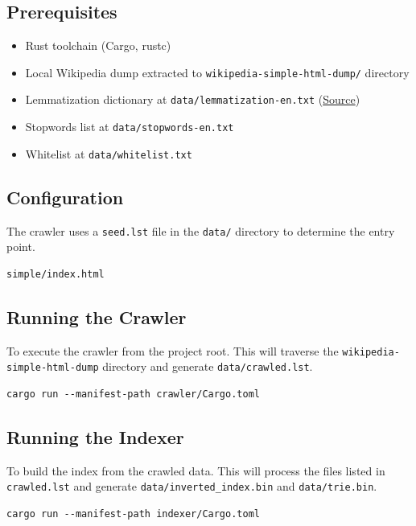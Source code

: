 \documentclass[11pt, a4paper]{article}
\begin{document}
\subsection{Prerequisites}
\begin{itemize}
    \item Rust toolchain (Cargo, rustc)
    \item Local Wikipedia dump extracted to \texttt{wikipedia-simple-html-dump/} directory
    \item Lemmatization dictionary at \texttt{data/lemmatization-en.txt} (\href{https://github.com/michmech/lemmatization-lists}{Source})
    \item Stopwords list at \texttt{data/stopwords-en.txt}
    \item Whitelist at \texttt{data/whitelist.txt}
\end{itemize}

\subsection{Configuration}
The crawler uses a \texttt{seed.lst} file in the \texttt{data/} directory to determine the entry point.

\begin{verbatim}
simple/index.html
\end{verbatim}

\subsection{Running the Crawler}
To execute the crawler from the project root. This will traverse the \texttt{wikipedia-simple-html-dump} directory and generate \texttt{data/crawled.lst}.

\begin{verbatim}
cargo run --manifest-path crawler/Cargo.toml
\end{verbatim}

\subsection{Running the Indexer}
To build the index from the crawled data. This will process the files listed in \texttt{crawled.lst} and generate \texttt{data/inverted\_index.bin} and \texttt{data/trie.bin}.

\begin{verbatim}
cargo run --manifest-path indexer/Cargo.toml
\end{verbatim}
\end{document}
